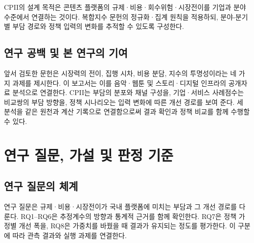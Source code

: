 \documentclass[11pt,a4paper]{report}
\begin{document}
CPII의 설계 목적은 콘텐츠 플랫폼의 규제·비용·회수위험·시장전이를 기업과 분야 수준에서 연결하는 것이다. 복합지수 문헌의 정규화·집계 원칙을 적용하되, 분야-분기별 부담 경로와 정책 입력의 변화를 추적할 수 있도록 구성한다.

\section{연구 공백 및 본 연구의 기여}
앞서 검토한 문헌은 시장력의 전이, 집행 시차, 비용 분담, 지수의 투명성이라는 네 가지 과제를 제시한다. 이 보고서는 이를 음악·웹툰 및 스토리·디지털 인프라의 공개자료 분석으로 연결한다. CPII는 부담의 분포와 채널 구성을, 기업·서비스 사례점수는 비교쌍의 부담 방향을, 정책 시나리오는 입력 변화에 따른 개선 경로를 보여 준다. 세 분석을 같은 원천과 계산 기록으로 연결함으로써 결과 확인과 정책 비교를 함께 수행할 수 있다.

\chapter{연구 질문, 가설 및 판정 기준}
\section{연구 질문의 체계}
\footnotesize
연구 질문은 규제·비용·시장전이가 국내 플랫폼에 미치는 부담과 그 개선 경로를 다룬다. RQ1--RQ6은 추정계수의 방향과 통계적 근거를 함께 확인한다. RQ7은 정책 가정별 개선 폭을, RQ8은 가중치를 바꿨을 때 결과가 유지되는 정도를 평가한다. 이 구분에 따라 관측 결과와 실행 과제를 연결한다.
\end{document}
